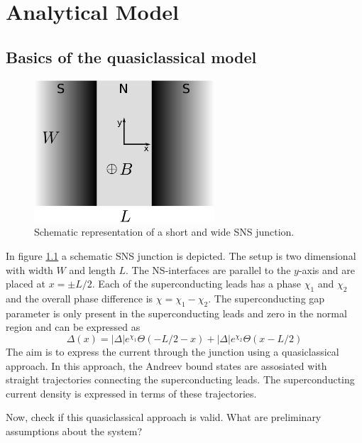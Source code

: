 \chapter{Analytical Model}
\label{ch:analyticalmodel}

\section{Basics of the quasiclassical model}
\begin{figure}
\centering
\includegraphics[width=0.6\textwidth]{figure/analyticalmodel/sns_junction.pdf}
\caption{Schematic representation of a short and wide SNS junction.}
\label{fig:sns_schematic}
\end{figure}

In figure \ref{fig:sns_schematic} a schematic SNS junction is depicted. The setup is two dimensional with width $W$ and length $L$. The NS-interfaces are parallel to the $y$-axis and are placed at $x = \pm L/2$. Each of the superconducting leads has a phase $\chi_{1}$ and $\chi_{2}$ and the overall phase difference is $\chi = \chi_{1} - \chi_{2}$.
The superconducting gap parameter is only present in the superconducting leads and zero in the normal region and can be expressed as
\begin{equation}
\Delta\left( x \right) = |\Delta| e^{\chi_1} \Theta\left(-L/2 -x \right) + |\Delta| e^{\chi_2} \Theta\left(x-L/2 \right) 
\end{equation}
The aim is to express the current through the junction using a quasiclassical approach. In this approach, the Andreev bound states are assosiated with straight trajectories connecting the superconducting leads. The superconducting current density is expressed in terms of these trajectories. 

Now, check if this quasiclassical approach is valid. What are preliminary assumptions about the system?

